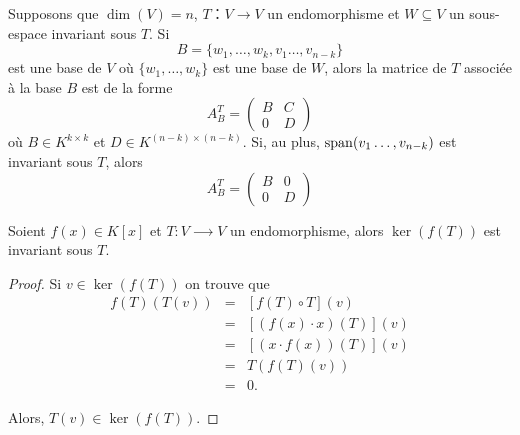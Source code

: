 \begin{remark}
  \label{rem:9}
Supposons que $\dim(V) = n$, $Τ ： V → V$ un endomorphisme et $W ⊆ V$ un sous-espace invariant sous $T$. Si
\begin{displaymath}
  B = \{w_1,\dots,w_k,v_1\dots,v_{n-k}\} 
\end{displaymath}
est une base de $V$ où $\{w_1,\dots,w_k\}$ est une base de $W$, alors la matrice de $T$ associée à la base $B$ est de la forme 
\begin{displaymath}
  A_B^T =
  \begin{pmatrix}
    B & C \\
    0 & D     
  \end{pmatrix}
\end{displaymath}
où $B ∈ K^{k×k}$ et $D ∈ K^{(n-k)×(n-k)}$. Si, au plus, $\operatorname{span}(v_1\dots,v_{n-k})$ est invariant sous $T$, alors
\begin{displaymath}
  A_B^T =
  \begin{pmatrix}
    B & 0 \\
    0 & D     
  \end{pmatrix}
\end{displaymath}
\end{remark}

\begin{lemma}
  \label{lem:20}
  Soient $f(x) ∈ K[x]$ et $T:V ⟶  V$ un endomorphisme,  alors $\ker(f(T))$ est invariant sous $T$. 
\end{lemma}


\begin{proof}
  Si $v ∈ \ker(f(T))$ on trouve que
  \begin{eqnarray*}
    f(T)(T(v))  & = & \left[f(T) \circ T \right](v)\\ 
                & = &     \left[(f(x) ⋅x)(T)\right] (v) \\
                & = & \left[(x ⋅ f(x))(T) \right] (v) \\
                &=& T (f(T)(v)) \\
                &=& 0.
  \end{eqnarray*}

  Alors, $T(v) ∈ \ker(f(T))$. 
\end{proof}



